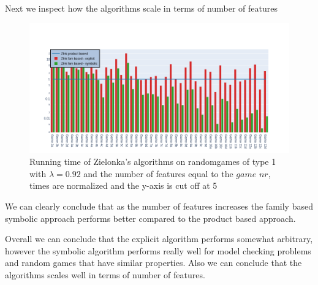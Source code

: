 Next we inspect how the algorithms scale in terms of number of features
\begin{figure}[H]
\includegraphics[width=1\linewidth]{"results/randomscalegames/Zlnk product based_Zlnk fam based - explicit_Zlnk fam based - symbolic_"}
\caption{Running time of Zielonka's algorithms on randomgames of type 1 with $\lambda = 0.92$ and the number of features equal to the $\textit{game nr}$, times are normalized and the y-axis is cut off at 5}
\label{fig:elevatorzlnks}
\end{figure}%
We can clearly conclude that as the number of features increases the family based symbolic approach performs better compared to the product based approach.

Overall we can conclude that the explicit algorithm performs somewhat arbitrary, however the symbolic algorithm performs really well for model checking problems and random games that have similar properties. Also we can conclude that the algorithms scales well in terms of number of features.


